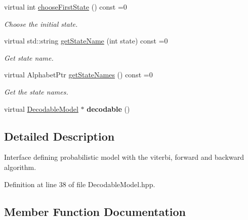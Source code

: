 \begin{DoxyCompactItemize}
virtual int \hyperlink{classtops_1_1DecodableModel_ac31959a6d852e2e00938294bd54f2667}{choose\+First\+State} () const =0
\begin{DoxyCompactList}\small\item\em Choose the initial state. \end{DoxyCompactList}\item 
\mbox{\label{classtops_1_1DecodableModel_aee6d21ab65252b50d335358b05a1aee9}} 
virtual std\+::string \hyperlink{classtops_1_1DecodableModel_aee6d21ab65252b50d335358b05a1aee9}{get\+State\+Name} (int state) const =0
\begin{DoxyCompactList}\small\item\em Get state name. \end{DoxyCompactList}\item 
\mbox{\label{classtops_1_1DecodableModel_aba6a89196c2cb2349349166227fc1e8b}} 
virtual Alphabet\+Ptr \hyperlink{classtops_1_1DecodableModel_aba6a89196c2cb2349349166227fc1e8b}{get\+State\+Names} () const =0
\begin{DoxyCompactList}\small\item\em Get the state names. \end{DoxyCompactList}\item 
\mbox{\label{classtops_1_1DecodableModel_a37326b129c2a20b12c79c1b2488adc93}} 
virtual \hyperlink{classtops_1_1DecodableModel}{Decodable\+Model} $\ast$ {\bfseries decodable} ()
\end{DoxyCompactItemize}


\subsection{Detailed Description}
Interface defining probabilistic model with the viterbi, forward and backward algorithm. 

Definition at line 38 of file Decodable\+Model.\+hpp.



\subsection{Member Function Documentation}
\mbox{\label{classtops_1_1DecodableModel_a9321fd7bca21551b4c5380e1f48ff5c2}} 
